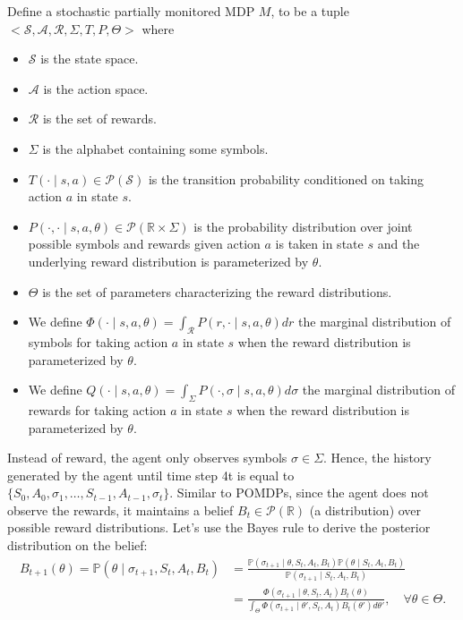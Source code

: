 \documentclass[a4paper]{article}
\theoremstyle{definition}
\newcommand{\cA}{\mathcal{A}}
\newcommand{\cS}{\mathcal{S}}
\newcommand{\cR}{\mathcal{R}}
\newcommand{\cP}{\mathcal{P}}
\newcommand{\R}{\mathbb{R}}
\renewcommand{\P}{\mathbb{P}}
\begin{document}
Define a stochastic partially monitored MDP $M$, to be a tuple $<\cS, \cA, \cR, \Sigma, T, P, \Theta>$ where
\begin{itemize}
    \item $\cS$ is the state space.
    \item $\cA$ is the action space.
    \item $\cR$ is the set of rewards.
    \item $\Sigma$ is the alphabet containing some symbols.
    \item $T(\cdot \mid s, a) \in \cP(\cS)$ is the transition probability conditioned on taking action $a$ in state $s$.
    \item $P(\cdot, \cdot \mid s, a, \theta) \in \cP(\R \times\Sigma)$ is the probability distribution over joint possible symbols and rewards given action $a$ is taken in state $s$ and the underlying reward distribution is parameterized by $\theta$.
    \item $\Theta$ is the set of parameters characterizing the reward distributions.
    \item We define $\Phi(\cdot \mid s, a, \theta) = \int_{\cR}P(r, \cdot \mid s, a , \theta)dr$ the marginal distribution of symbols for taking action $a$ in state $s$ when the reward distribution is parameterized by $\theta$.
    \item We define $Q(\cdot \mid s, a, \theta) = \int_{\Sigma}P(\cdot, \sigma \mid s, a , \theta)d\sigma$ the marginal distribution of rewards for taking action $a$ in state $s$ when the reward distribution is parameterized by $\theta$.
\end{itemize}
Instead of reward, the agent only observes symbols $\sigma \in \Sigma$. Hence, the history generated by the agent until time step 4t is equal to $\{S_0, A_0, \sigma_1, \dots, S_{t - 1}, A_{t - 1}, \sigma_t \}$. Similar to POMDPs, since the agent does not observe the rewards, it maintains a belief $B_t \in \cP(\R)$ (a distribution) over possible reward distributions. Let's use the Bayes rule to derive the posterior distribution on the belief:
\begin{align}
B_{t + 1}\left(\theta \right) = \P(\theta \mid \sigma_{t + 1}, S_t, A_t, B_t) & = \frac{\P(\sigma_{t + 1} \mid \theta, S_t, A_t, B_t)\P(\theta \mid S_t, A_t, B_t)}{\P(\sigma_{t + 1} \mid S_t, A_t, B_t)} \nonumber \\
     &= \frac{\Phi(\sigma_{t + 1} \mid \theta, S_t, A_t)B_t(\theta)}{\int_{\Theta}\Phi(\sigma_{t + 1} \mid \theta', S_t, A_t) B_t(\theta') d\theta'}, \quad \forall \theta \in \Theta. \nonumber
\end{align}
%
\end{document}
